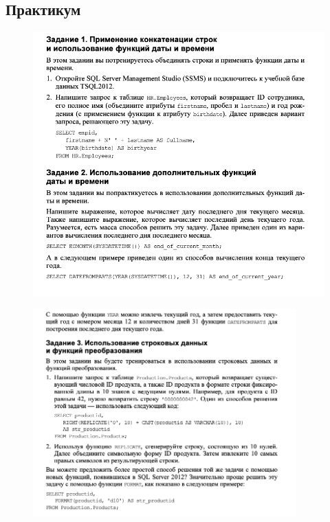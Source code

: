 \newpage
\subsection*{Практикум}

\begin{figure}[h!]
	\begin{center}
		\includegraphics[width=1\textwidth]{img/prac1.png}
	\end{center}
	\captionsetup{justification=centering}
\end{figure}
\clearpage

\begin{figure}[h!]
	\begin{center}
		\includegraphics[width=0.9\textwidth]{img/prac2.png}
	\end{center}
	\captionsetup{justification=centering}
\end{figure}


